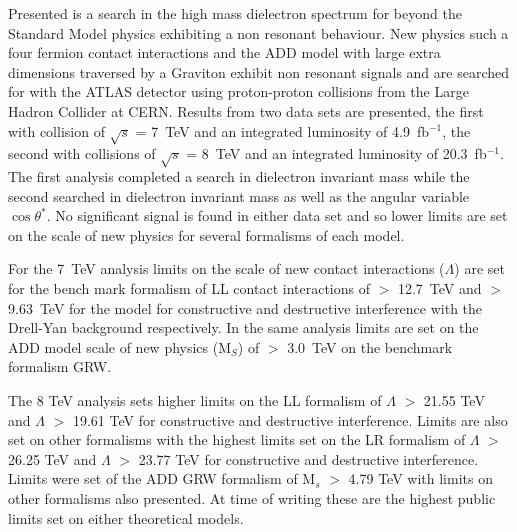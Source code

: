 

Presented is a search in the high mass dielectron spectrum for beyond the Standard Model physics exhibiting a non resonant behaviour. New physics such a four fermion contact interactions and the ADD model with large extra dimensions traversed by a Graviton exhibit non resonant signals and are searched for with the ATLAS detector using proton-proton collisions from the Large Hadron Collider at CERN. Results from two data sets are presented, the first with collision of $\sqrt{s}$ = 7~TeV and an integrated luminosity of 4.9~fb$^{-1}$, the second with collisions of $\sqrt{s}$ = 8~TeV and an integrated luminosity of 20.3~fb$^{-1}$. The first analysis completed a search in dielectron invariant mass while the second searched in dielectron invariant mass as well as the angular variable $\cos{\theta^{*}}$. 
No significant signal is found in either data set and so lower limits are set on the scale of new physics for several formalisms of each model. 

For the 7~TeV analysis limits on the scale of new contact interactions ($\Lambda$) are set for the bench mark formalism of LL contact interactions of $>$ 12.7~TeV and $>$ 9.63~TeV for the model for constructive and destructive interference with the Drell-Yan background respectively. In the same analysis limits are set on the ADD model scale of new physics (M$_{S}$) of $>$ 3.0~TeV on the benchmark formalism GRW.

The 8 TeV analysis sets higher limits on the LL formalism of $\Lambda$ $>$ 21.55 TeV and $\Lambda$ $>$ 19.61 TeV for constructive and destructive interference. Limits are also set on other formalisms with the highest limits set on the LR formalism of $\Lambda$ $>$ 26.25 TeV and $\Lambda$ $>$ 23.77 TeV for constructive and destructive interference. Limits were set of the ADD GRW formalism of M$_{s}$ $>$ 4.79 TeV with limits on other formalisms also presented. At time of writing these are the highest public limits set on either theoretical models.



